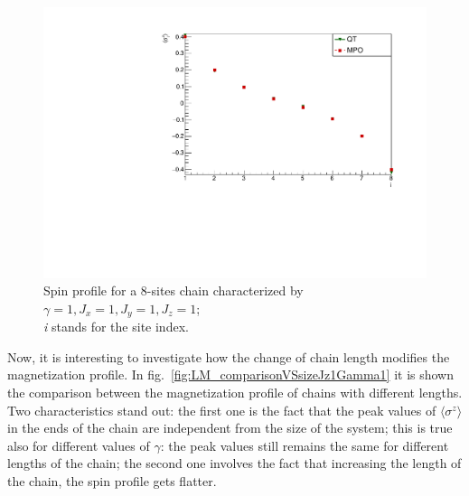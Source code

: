 \begin{figure}[H]
    \centering
    \includegraphics[scale=0.7]{Figures/8sites/LMComparison_8sJ1051.pdf}
    \captionsetup{width=1.\linewidth}
    \caption{Spin profile for a 8-sites chain characterized by $\gamma=1, J_x=1, J_y=1, J_z=1$; \\ \emph{i} stands for the site index.}
    \label{fig:8sites_LMcomparisonJz1}
\end{figure}

Now, it is interesting to investigate how the change of chain length modifies the magnetization profile. In fig.~\ref{fig:LM_comparisonVSsizeJz1Gamma1} it is shown the comparison between the magnetization profile of chains with different lengths. Two characteristics stand out: the first one is the fact that the peak values of $\langle\sigma^z\rangle$ in the ends of the chain are independent from the size of the system; this is true also for different values of $\gamma$: the peak values still remains the same for different lengths of the chain; the second one involves the fact that increasing the length of the chain, the spin profile gets flatter.

